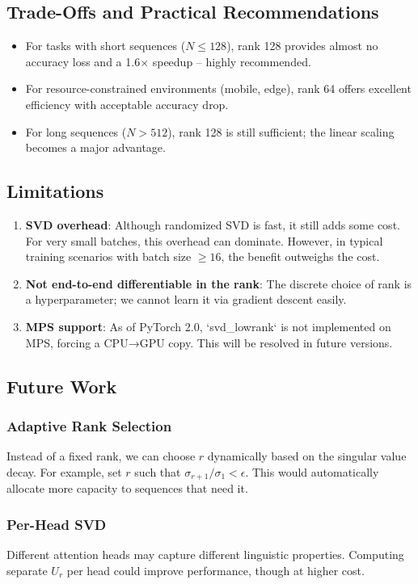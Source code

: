 \documentclass[twocolumn]{article}
\begin{document}
\subsection{Trade-Offs and Practical Recommendations}
\begin{itemize}
    \item For tasks with short sequences ($N \le 128$), rank 128 provides almost no accuracy loss and a 1.6× speedup – highly recommended.
    \item For resource-constrained environments (mobile, edge), rank 64 offers excellent efficiency with acceptable accuracy drop.
    \item For long sequences ($N > 512$), rank 128 is still sufficient; the linear scaling becomes a major advantage.
\end{itemize}

\subsection{Limitations}
\begin{enumerate}
    \item \textbf{SVD overhead}: Although randomized SVD is fast, it still adds some cost. For very small batches, this overhead can dominate. However, in typical training scenarios with batch size $\ge 16$, the benefit outweighs the cost.
    \item \textbf{Not end-to-end differentiable in the rank}: The discrete choice of rank is a hyperparameter; we cannot learn it via gradient descent easily.
    \item \textbf{MPS support}: As of PyTorch 2.0, `svd\_lowrank` is not implemented on MPS, forcing a CPU→GPU copy. This will be resolved in future versions.
\end{enumerate}

\subsection{Future Work}
\subsubsection{Adaptive Rank Selection}
Instead of a fixed rank, we can choose $r$ dynamically based on the singular value decay. For example, set $r$ such that $\sigma_{r+1} / \sigma_1 < \epsilon$. This would automatically allocate more capacity to sequences that need it.

\subsubsection{Per-Head SVD}
Different attention heads may capture different linguistic properties. Computing separate $U_r$ per head could improve performance, though at higher cost.
\end{document}
